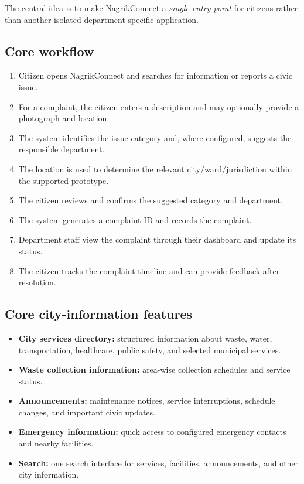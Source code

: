 \documentclass[11pt,a4paper]{article}
\begin{document}
The central idea is to make NagrikConnect a \emph{single entry point} for citizens rather than another isolated department-specific application.

\subsection{Core workflow}
\begin{enumerate}[leftmargin=0.7cm]
    \item Citizen opens NagrikConnect and searches for information or reports a civic issue.
    \item For a complaint, the citizen enters a description and may optionally provide a photograph and location.
    \item The system identifies the issue category and, where configured, suggests the responsible department.
    \item The location is used to determine the relevant city/ward/jurisdiction within the supported prototype.
    \item The citizen reviews and confirms the suggested category and department.
    \item The system generates a complaint ID and records the complaint.
    \item Department staff view the complaint through their dashboard and update its status.
    \item The citizen tracks the complaint timeline and can provide feedback after resolution.
\end{enumerate}

\subsection{Core city-information features}
\begin{itemize}[leftmargin=0.7cm]
    \item \textbf{City services directory:} structured information about waste, water, transportation, healthcare, public safety, and selected municipal services.
    \item \textbf{Waste collection information:} area-wise collection schedules and service status.
    \item \textbf{Announcements:} maintenance notices, service interruptions, schedule changes, and important civic updates.
    \item \textbf{Emergency information:} quick access to configured emergency contacts and nearby facilities.
    \item \textbf{Search:} one search interface for services, facilities, announcements, and other city information.
\end{itemize}
\end{document}
